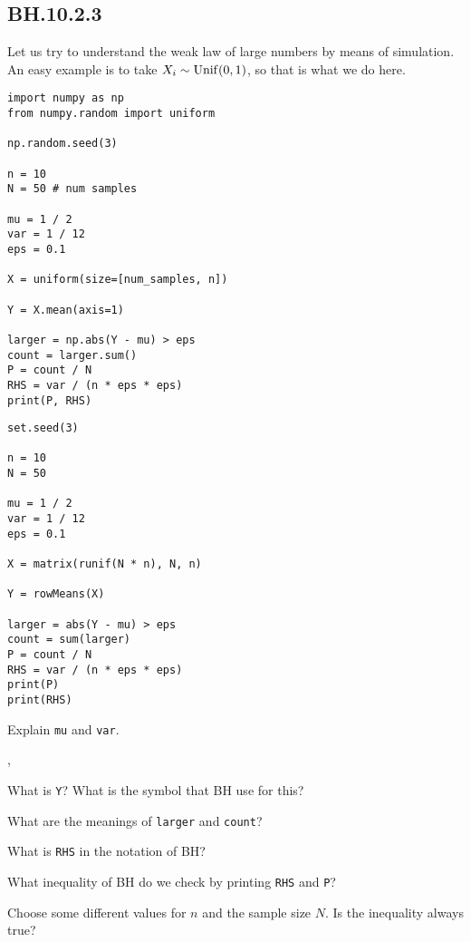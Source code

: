 


\subsection{BH.10.2.3}

Let us try to understand the weak law of large numbers by means of simulation. An easy example is to take $X_{i}\sim\mathrm{Unif}(0,1)$, so that is what we do here.

\begin{verbatim}
import numpy as np
from numpy.random import uniform

np.random.seed(3)

n = 10
N = 50 # num samples

mu = 1 / 2
var = 1 / 12
eps = 0.1

X = uniform(size=[num_samples, n])

Y = X.mean(axis=1)

larger = np.abs(Y - mu) > eps
count = larger.sum()
P = count / N
RHS = var / (n * eps * eps)
print(P, RHS)
\end{verbatim}

\begin{verbatim}
set.seed(3)

n = 10
N = 50

mu = 1 / 2
var = 1 / 12
eps = 0.1

X = matrix(runif(N * n), N, n)

Y = rowMeans(X)

larger = abs(Y - mu) > eps
count = sum(larger)
P = count / N
RHS = var / (n * eps * eps)
print(P)
print(RHS)
\end{verbatim}


\begin{exercise}
Explain \texttt{mu} and \texttt{var}.
\end{exercise}
,
\begin{exercise}
What is \texttt{Y}? What is the symbol that BH use for this?
\end{exercise}

\begin{exercise}
What are the meanings of \texttt{larger} and \texttt{count}?
\end{exercise}

\begin{exercise}
What is \texttt{RHS} in the notation of BH?
\end{exercise}

\begin{exercise}
What inequality of BH do we check by printing \texttt{RHS}  and \texttt{P}?
\end{exercise}

\begin{exercise}
Choose some different values for $n$ and the sample size $N$. Is the inequality always true?
\end{exercise}


